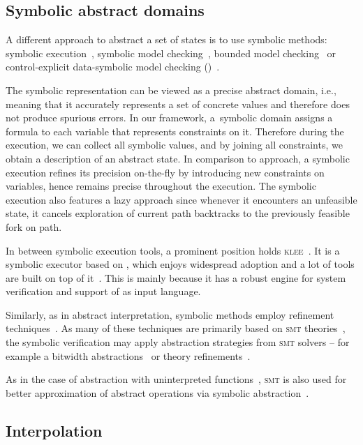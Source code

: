 \subsection{Symbolic abstract domains}

A different approach to abstract a set of states is to use symbolic methods:
symbolic execution~\cite{King76, Cadar2013symbolic, Baldoni2018survey}, symbolic model
checking~\cite{Clarke96, McMillan93, Cimatti20}, bounded model
checking~\cite{Biere2003bounded} or control-explicit data-symbolic model
checking (\ceds)~\cite{Mrazek2016}.

The symbolic representation can be viewed as a precise abstract domain, i.e.,
meaning that it accurately represents a set of concrete values and therefore
does not produce spurious errors. In our framework, a~symbolic domain assigns
a formula to each variable that represents constraints on it. Therefore during
the execution, we can collect all symbolic values, and by joining all
constraints, we obtain a description of an abstract state. In comparison to
\cegar approach, a symbolic execution refines its precision on-the-fly by
introducing new constraints on variables, hence remains precise throughout the
execution. The symbolic execution also features a lazy approach since whenever
it encounters an unfeasible state, it cancels exploration of current path
backtracks to the previously feasible fork on path.

In between symbolic execution tools, a prominent position holds
\textsc{klee}~\cite{Cadar2008klee}. It is a symbolic executor based on \llvm,
which enjoys widespread adoption and a lot of tools are built on top of
it~\cite{Beyer2018Klee, Chalupa2018, Chen2018, Menezes2018}. This is mainly because it
has a robust engine for system verification and support of \llvm as input
language.

Similarly, as in abstract interpretation, symbolic methods employ refinement
techniques~\cite{Beyer2016}. As many of these techniques are primarily based on
\textsc{smt} theories~\cite{Beyer2018}, the symbolic verification may apply abstraction
strategies from \textsc{smt} solvers -- for example a bitwidth
abstractions~\cite{Jonavs2018} or theory refinements~\cite{Hyvarinen2017}.

As in the case of abstraction with uninterpreted functions~\cite{Gange2016}, \textsc{smt} is also used for better approximation of abstract operations via symbolic abstraction~\cite{Thakur2012}.

\subsection{Interpolation}
\label{sec:interpolation}

